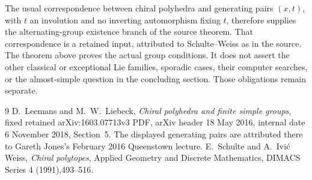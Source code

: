 \documentclass[11pt,a4paper]{article}
\begin{document}
The usual correspondence between chiral polyhedra and generating pairs
$(x,t)$, with $t$ an involution and no inverting automorphism fixing $t$,
therefore supplies the alternating-group existence branch of the source
theorem. That correspondence is a retained input, attributed to
Schulte--Weiss as in the source. The theorem above proves the actual group
conditions. It does not assert the other classical or exceptional Lie
families, sporadic cases, their computer searches, or the almost-simple
question in the concluding section. Those obligations remain separate.

\begin{thebibliography}{9}
 D.~Leemans and M.~W.~Liebeck,
\emph{Chiral polyhedra and finite simple groups}, fixed retained
arXiv:1603.07713v3 PDF, arXiv header 18 May 2016, internal date
6 November 2018, Section~5. The displayed generating pairs are attributed
there to Gareth Jones's February 2016 Queenstown lecture.
 E.~Schulte and A.~Ivi\'c Weiss, \emph{Chiral polytopes},
Applied Geometry and Discrete Mathematics, DIMACS Series 4 (1991),493--516.
\end{thebibliography}
\end{document}
